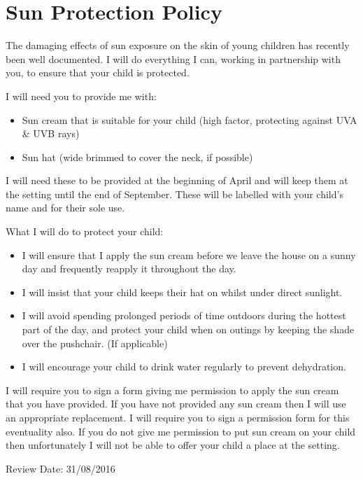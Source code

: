 

\section{Sun Protection Policy}

The damaging effects of sun exposure on the skin of young children has recently been well documented. I will do everything I can, working in partnership with you, to ensure that your child is protected.

I will need you to provide me with:
\begin{itemize}
\item Sun cream that is suitable for your child (high factor, protecting against UVA \& UVB rays)
\item Sun hat (wide brimmed to cover the neck, if possible)
\end{itemize}

I will need these to be provided at the beginning of April and will keep them at the setting until the end of September. These will be labelled with your child's name and for their sole use.

What I will do to protect your child:

\begin{itemize}
\item I will ensure that I apply the sun cream before we leave the house on a sunny day and frequently reapply it throughout the day. 
\item I will insist that your child keeps their hat on whilst under direct sunlight. 
\item I will avoid spending prolonged periods of time outdoors during the hottest part of the day, and protect your child when on outings by keeping the shade over the pushchair. (If applicable) 
\item I will encourage your child to drink water regularly to prevent dehydration. 
\end{itemize}

I will require you to sign a form giving me permission to apply the sun cream that you have provided. If you have not provided any sun cream then I will use an appropriate replacement. I will require you to sign a permission form for this eventuality also. If you do not give me permission to put sun cream on your child then unfortunately I will not be able to offer your child a place at the setting.

Review Date: 31/08/2016



